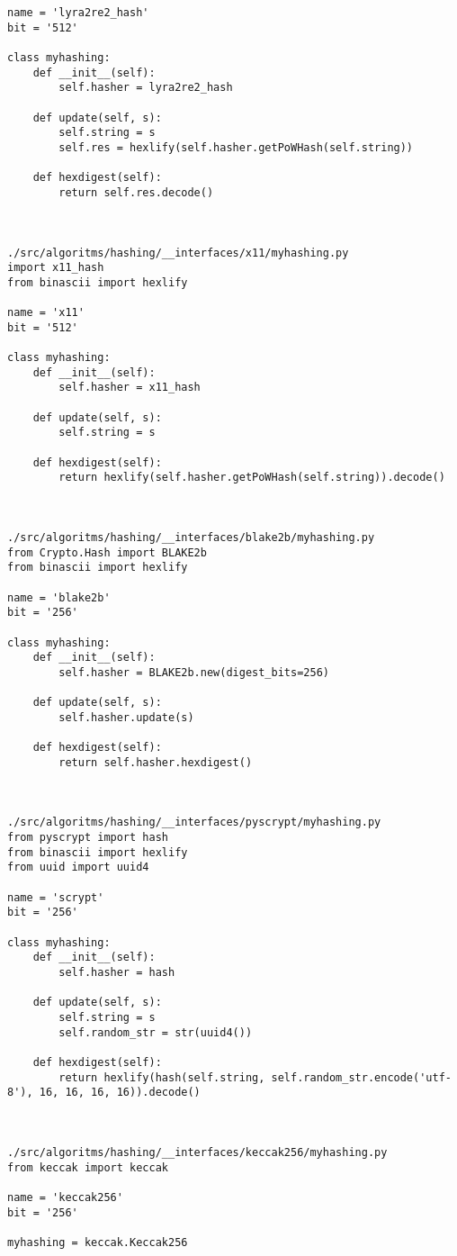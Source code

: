 \begin{lstlisting}
name = 'lyra2re2_hash'
bit = '512'

class myhashing:
    def __init__(self):
        self.hasher = lyra2re2_hash

    def update(self, s):
        self.string = s
        self.res = hexlify(self.hasher.getPoWHash(self.string))

    def hexdigest(self):
        return self.res.decode()



./src/algoritms/hashing/__interfaces/x11/myhashing.py
import x11_hash
from binascii import hexlify

name = 'x11'
bit = '512'

class myhashing:
    def __init__(self):
        self.hasher = x11_hash

    def update(self, s):
        self.string = s

    def hexdigest(self):
        return hexlify(self.hasher.getPoWHash(self.string)).decode()



./src/algoritms/hashing/__interfaces/blake2b/myhashing.py
from Crypto.Hash import BLAKE2b
from binascii import hexlify

name = 'blake2b'
bit = '256'

class myhashing:
    def __init__(self):
        self.hasher = BLAKE2b.new(digest_bits=256)

    def update(self, s):
        self.hasher.update(s)

    def hexdigest(self):
        return self.hasher.hexdigest()



./src/algoritms/hashing/__interfaces/pyscrypt/myhashing.py
from pyscrypt import hash
from binascii import hexlify
from uuid import uuid4

name = 'scrypt'
bit = '256'

class myhashing:
    def __init__(self):
        self.hasher = hash

    def update(self, s):
        self.string = s
        self.random_str = str(uuid4())

    def hexdigest(self):
        return hexlify(hash(self.string, self.random_str.encode('utf-8'), 16, 16, 16, 16)).decode()



./src/algoritms/hashing/__interfaces/keccak256/myhashing.py
from keccak import keccak

name = 'keccak256'
bit = '256'

myhashing = keccak.Keccak256



\end{lstlisting}

